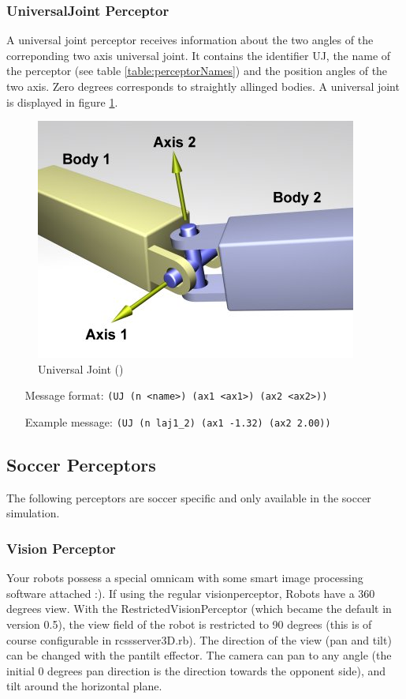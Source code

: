 \subsubsection{UniversalJoint Perceptor}
A universal joint perceptor receives information about the two angles of the
correponding two axis universal joint. It contains the identifier UJ, the name
of the perceptor (see table \ref{table:perceptorNames}) and the position angles of the two axis.
Zero degrees corresponds to straightly allinged bodies. A universal joint is
displayed in figure \ref{ode:universaljoint}. 
\begin{figure}[htbp]
  \begin{center}
	\includegraphics[scale=0.6]{fig/UniversalJoint.png}
    \caption{Universal Joint (\cite{ODEManual})}
    \label{ode:universaljoint}
  \end{center}
\end{figure}
 
\begin{itemize}
	\item[Message format:] \texttt{(UJ (n <name>) (ax1 <ax1>) (ax2 <ax2>))}
	\item[Example message:] \texttt{(UJ (n laj1\_2) (ax1 -1.32) (ax2 2.00))}
\end{itemize}

\subsection{Soccer Perceptors}
The following perceptors are soccer specific and only available in the soccer
simulation.

\subsubsection{Vision Perceptor}
Your robots possess a special omnicam with some smart image processing
software attached :). If using the regular visionperceptor, Robots
have a 360 degrees view. With the RestrictedVisionPerceptor (which
became the default in version 0.5), the view field of the robot is
restricted to 90 degrees (this is of course configurable in
rcssserver3D.rb). The direction of the view (pan and tilt) can be
changed with the pantilt effector. The camera can pan to any angle
(the initial 0 degrees pan direction is the direction towards the
opponent side), and tilt around the horizontal plane.

